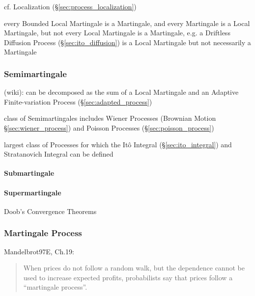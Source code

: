 cf. Localization (\S\ref{sec:process_localization})

every Bounded Local Martingale is a Martingale, and every Martingale is a Local
Martingale, but not every Local Martingale is a Martingale, e.g. a Driftless
Diffusion Process (\S\ref{sec:ito_diffusion}) is a Local Martingale but not
necessarily a Martingale



\subsubsection{Semimartingale}\label{sec:semimartingale}

(wiki): can be decomposed as the sum of a Local Martingale and an Adaptive
Finite-variation Process (\S\ref{sec:adapted_process})

class of Semimartingales includes Wiener Processes (Brownian Motion
\S\ref{sec:wiener_process}) and Poisson Processes
(\S\ref{sec:poisson_process})

largest class of Processes for which the It\^o Integral
(\S\ref{sec:ito_integral}) and Stratanovich Integral can be defined



\paragraph{Submartingale}\label{sec:submartingale}\hfill

\paragraph{Supermartingale}\label{sec:supermartingale}\hfill

Doob's Convergence Theorems



\subsubsection{Martingale Process}\label{sec:martingale_process}


Mandelbrot97E, Ch.19:

\begin{quote}
  When prices do not follow a random walk, but the dependence cannot be used to
  increase expected profits, probabilists say that prices follow a ``martingale
  process''.
\end{quote}

